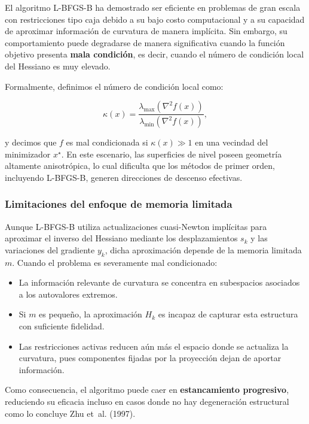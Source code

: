 \documentclass[
  spanish,
  us-letterpaper,
]{scrreprt}
\providecommand{\tightlist}{%
  \setlength{\itemsep}{0pt}\setlength{\parskip}{0pt}}
\numberwithin{equation}{section}
\begin{document}
El algoritmo L-BFGS-B ha demostrado ser eficiente en problemas de gran
escala con restricciones tipo caja debido a su bajo costo computacional
y a su capacidad de aproximar información de curvatura de manera
implícita. Sin embargo, su comportamiento puede degradarse de manera
significativa cuando la función objetivo presenta \textbf{mala
condición}, es decir, cuando el número de condición local del Hessiano
es muy elevado.

Formalmente, definimos el número de condición local como:

\[
\kappa(x) = \frac{\lambda_{\max}(\nabla^2 f(x))}{\lambda_{\min}(\nabla^2 f(x))},
\]

y decimos que \(f\) es mal condicionada si \(\kappa(x) \gg 1\) en una
vecindad del minimizador \(x^\star\). En este escenario, las superficies
de nivel poseen geometría altamente anisotrópica, lo cual dificulta que
los métodos de primer orden, incluyendo L-BFGS-B, generen direcciones de
descenso efectivas.

\subsubsection{Limitaciones del enfoque de memoria
limitada}\label{limitaciones-del-enfoque-de-memoria-limitada}

Aunque L-BFGS-B utiliza actualizaciones cuasi-Newton implícitas para
aproximar el inverso del Hessiano mediante los desplazamientos \(s_k\) y
las variaciones del gradiente \(y_k\), dicha aproximación depende de la
memoria limitada \(m\). Cuando el problema es severamente mal
condicionado:

\begin{itemize}
\tightlist
\item
  La información relevante de curvatura se concentra en subespacios
  asociados a los autovalores extremos.
\item
  Si \(m\) es pequeño, la aproximación \(H_k\) es incapaz de capturar
  esta estructura con suficiente fidelidad.
\item
  Las restricciones activas reducen aún más el espacio donde se
  actualiza la curvatura, pues componentes fijadas por la proyección
  dejan de aportar información.
\end{itemize}

Como consecuencia, el algoritmo puede caer en \textbf{estancamiento
progresivo}, reduciendo su eficacia incluso en casos donde no hay
degeneración estructural como lo concluye Zhu et~al. (1997).
\end{document}
